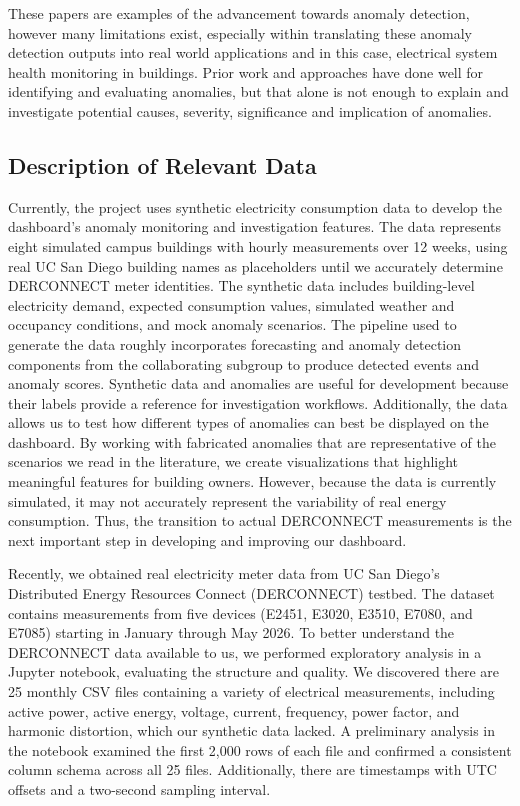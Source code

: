 \documentclass[12pt,letterpaper]{article}
\begin{document}
These papers are examples of the advancement towards anomaly detection, however many limitations exist, especially within translating these anomaly detection outputs into real world applications and in this case, electrical system health monitoring in buildings. Prior work and approaches have done well for identifying and evaluating anomalies, but that alone is not enough to explain and investigate potential causes, severity, significance and implication of anomalies.

\subsection{Description of Relevant Data}

Currently, the project uses synthetic electricity consumption data to develop the dashboard's anomaly monitoring and investigation features. The data represents eight simulated campus buildings with hourly measurements over 12 weeks, using real UC San Diego building names as placeholders until we accurately determine DERCONNECT meter identities. The synthetic data includes building-level electricity demand, expected consumption values, simulated weather and occupancy conditions, and mock anomaly scenarios. The pipeline used to generate the data roughly incorporates forecasting and anomaly detection components from the collaborating subgroup to produce detected events and anomaly scores. Synthetic data and anomalies are useful for development because their labels provide a reference for investigation workflows. Additionally, the data allows us to test how different types of anomalies can best be displayed on the dashboard. By working with fabricated anomalies that are representative of the scenarios we read in the literature, we create visualizations that highlight meaningful features for building owners. However, because the data is currently simulated, it may not accurately represent the variability of real energy consumption. Thus, the transition to actual DERCONNECT measurements is the next important step in developing and improving our dashboard.

Recently, we obtained real electricity meter data from UC San Diego's Distributed Energy Resources Connect (DERCONNECT) testbed. The dataset contains measurements from five devices (E2451, E3020, E3510, E7080, and E7085) starting in January through May 2026. To better understand the DERCONNECT data available to us, we performed exploratory analysis in a Jupyter notebook, evaluating the structure and quality. We discovered there are 25 monthly CSV files containing a variety of electrical measurements, including active power, active energy, voltage, current, frequency, power factor, and harmonic distortion, which our synthetic data lacked. A preliminary analysis in the notebook examined the first 2,000 rows of each file and confirmed a consistent column schema across all 25 files. Additionally, there are timestamps with UTC offsets and a two-second sampling interval.
\end{document}
